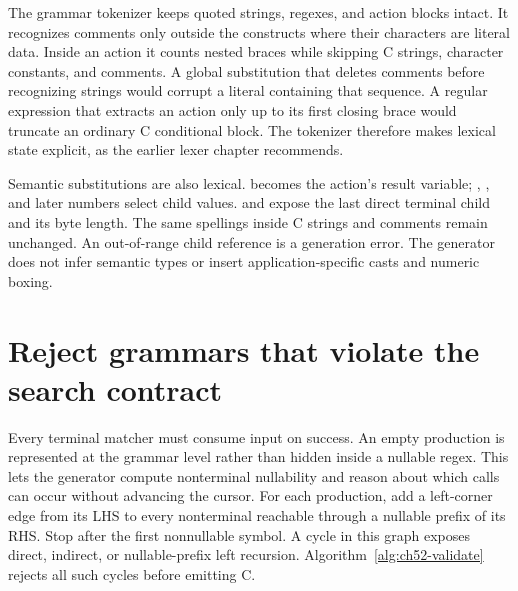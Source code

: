 \begin{listing}[htbp]
\inputminted[firstline=1,lastline=13]{text}{example-code/aurocks/backtrack.g}
\caption{The regression grammar distinguishes full backtracking from local first-success choice.}
\label{lst:ch52-backtrack}
\end{listing}

The grammar tokenizer keeps quoted strings, regexes, and action blocks intact.
It recognizes comments only outside the constructs where their characters are literal data.
Inside an action it counts nested braces while skipping C strings, character constants, and comments.
A global substitution that deletes \code{//} comments before recognizing strings would corrupt a literal containing that sequence.
A regular expression that extracts an action only up to its first closing brace would truncate an ordinary C conditional block.
The tokenizer therefore makes lexical state explicit, as the earlier lexer chapter recommends.

Semantic substitutions are also lexical.
\code{\$\$} becomes the action's result variable; , , and later numbers select child values.
 and  expose the last direct terminal child and its byte length.
The same spellings inside C strings and comments remain unchanged.
An out-of-range child reference is a generation error.
The generator does not infer semantic types or insert application-specific casts and numeric boxing.

\section{Reject grammars that violate the search contract}
\label{sec:ch52-validation}

Every terminal matcher must consume input on success.
An empty production is represented at the grammar level rather than hidden inside a nullable regex.
This lets the generator compute nonterminal nullability and reason about which calls can occur without advancing the cursor.
For each production, add a left-corner edge from its LHS to every nonterminal reachable through a nullable prefix of its RHS.
Stop after the first nonnullable symbol.
A cycle in this graph exposes direct, indirect, or nullable-prefix left recursion.
Algorithm~\ref{alg:ch52-validate} rejects all such cycles before emitting C.

